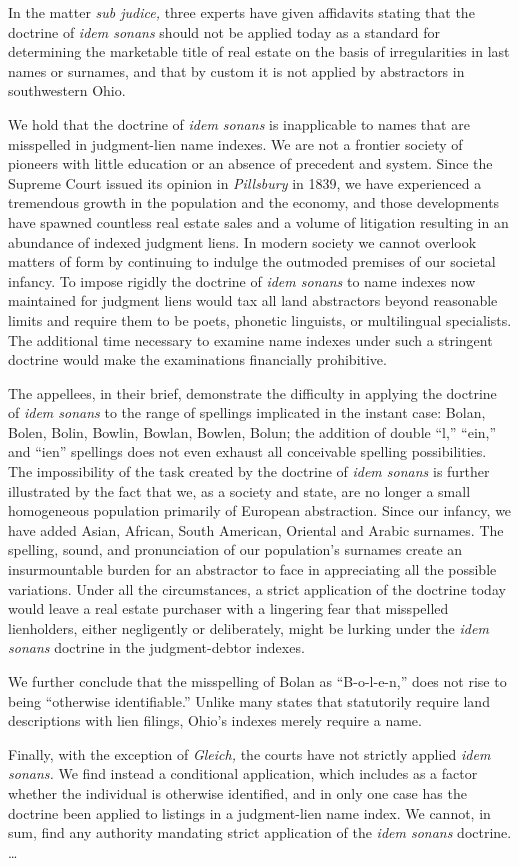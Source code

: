 In the matter \textit{sub judice,} three experts have given affidavits stating
that the doctrine of \textit{idem sonans} should not be applied today as a
standard for determining the marketable title of real estate on the basis of
irregularities in last names or surnames, and that by custom it is not applied
by abstractors in southwestern Ohio.

We hold that the doctrine of \textit{idem sonans} is inapplicable to names that
are misspelled in judgment-lien name indexes. We are not a frontier society of
pioneers with little education or an absence of precedent and system. Since the
Supreme Court issued its opinion in \textit{Pillsbury} in 1839, we have
experienced a tremendous growth in the population and the economy, and those
developments have spawned countless real estate sales and a volume of
litigation resulting in an abundance of indexed judgment liens. In modern
society we cannot overlook matters of form by continuing to indulge the
outmoded premises of our societal infancy. To impose rigidly the doctrine of
\textit{idem sonans} to name indexes now maintained for judgment liens would
tax all land abstractors beyond reasonable limits and require them to be poets,
phonetic linguists, or multilingual specialists. The additional time necessary
to examine name indexes under such a stringent doctrine would make the
examinations financially prohibitive.

The appellees, in their brief, demonstrate the difficulty in applying the
doctrine of \textit{idem sonans} to the range of spellings implicated in the
instant case: Bolan, Bolen, Bolin, Bowlin, Bowlan, Bowlen, Bolun; the addition
of double ``l,'' ``ein,'' and ``ien'' spellings does not even exhaust all
conceivable spelling possibilities. The impossibility of the task created by
the doctrine of \textit{idem sonans} is further illustrated by the fact that
we, as a society and state, are no longer a small homogeneous population
primarily of European abstraction. Since our infancy, we have added Asian,
African, South American, Oriental and Arabic surnames. The spelling, sound, and
pronunciation of our population's surnames create an insurmountable burden for
an abstractor to face in appreciating all the possible variations. Under all
the circumstances, a strict application of the doctrine today would leave a
real estate purchaser with a lingering fear that misspelled lienholders, either
negligently or deliberately, might be lurking under the \textit{idem sonans}
doctrine in the judgment-debtor indexes.

We further conclude that the misspelling of Bolan as ``B-o-l-e-n,'' does not
rise to being ``otherwise identifiable.'' Unlike many states that statutorily
require land descriptions with lien filings, Ohio's indexes merely require a
name.

Finally, with the exception of \textit{Gleich,} the courts have not strictly
applied \textit{idem sonans.} We find instead a conditional application, which
includes as a factor whether the individual is otherwise identified, and in
only one case has the doctrine been applied to listings in a judgment-lien name
index. We cannot, in sum, find any authority mandating strict application of
the \textit{idem sonans} doctrine. \dots{}

